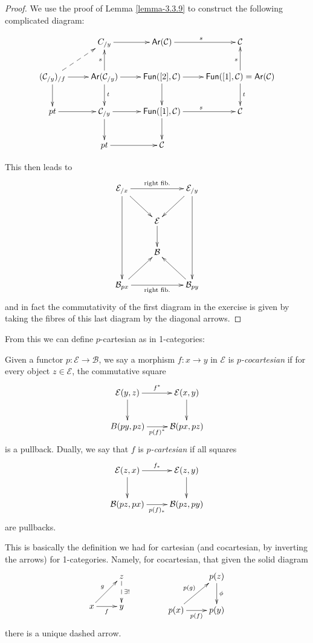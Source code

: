 \begin{proof}
We use the proof of Lemma \ref{lemma-3.3.9}
to construct the following complicated diagram:

$$
\xymatrix{
&C_{/y}\ar[r]&\mathsf{Ar}(\mathcal{C})\ar[r]^s&\mathcal{C}\\
(\mathcal{C}_{/y})_{/f}\ar@{-->}[ur]\ar[r]\ar[d]
&\mathsf{Ar}(\mathcal{C}_{/y})\ar[d]^t\ar[r]\ar[u]^s&
\mathsf{Fun}([2],\mathcal{C})\ar[d]\ar[r]
&\mathsf{Fun}([1],\mathcal{C})=\mathsf{Ar}(\mathcal{C})\ar[d]^t\ar[u]^s\\
pt\ar[r]&\mathcal{C}_{/y}\ar[d]\ar[r]
&\mathsf{Fun}([1],\mathcal{C})\ar[r]^s \ar[d]&\mathcal{C}\\
&pt\ar[r]&\mathcal{C}
}

$$

This then leads to
$$
\xymatrix{
\mathcal{E}_{/x}\ar[rd]\ar[rr]^{\text{right fib.}}\ar[ddd]
& & \mathcal{E}_{/y}\ar[ddd]\ar[dl]\\
& \mathcal{E}\ar[d]\\
&\mathcal{B}\\
\mathcal{B}_{px}\ar[ur]\ar[rr]_{\text{right fib.}}&&
\mathcal{B}_{py}\ar[lu]
}
$$
and in fact the commutativity of the first diagram
in the exercise is given by taking the fibres
of this last diagram by the diagonal arrows.
\end{proof}
\noindent
From this we can define $p$-cartesian as in 1-categories:

\begin{definition}
\label{definition-p-cocartesian}
Given a functor $p:\mathcal{E} \to \mathcal{B}$,
we say a morphism $f:x\to y$ 
in $\mathcal{E}$ is {\it $p$-cocartesian} 
if for every object $z \in \mathcal{E}$, the commutative square
$$
\xymatrix{
\mathcal{E}(y,z)\ar[r]^{f^*}\ar[d]&\mathcal{E}(x,y)\ar[d]\\
B(py,pz)\ar[r]_{p(f)^*}&\mathcal{B}(px,pz)
}
$$
is a pullback. Dually, we say that $f$ is {\it $p$-cartesian}
if all squares
$$
\xymatrix{
\mathcal{E}(z,x)\ar[r]^{f_*}\ar[d]&\mathcal{E}(z,y)\ar[d]\\
\mathcal{B}(pz,px)\ar[r]_{p(f)_*}&\mathcal{B}(pz,py)
}
$$
are pullbacks.
\end{definition}

\noindent
This is basically the definition we had for
cartesian (and cocartesian, by inverting the arrows)
for 1-categories. Namely, for cocartesian, that given the solid diagram
$$
\xymatrix{
&z\ar@{-->}[d]^{\exists !}\\
x\ar[ur]^g\ar[r]_f&y
}
\qquad \qquad 
\xymatrix{
&p(z)\ar[d]^\phi\\
p(x)\ar[ur]^{p(g)}\ar[r]_{p(f)}&p(y)
}
$$
there is a unique dashed arrow.


